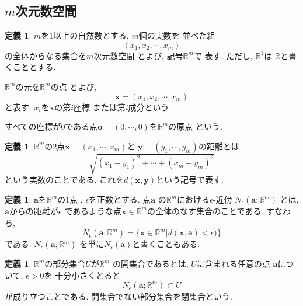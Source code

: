 \documentclass[a4j,12pt]{jarticle}
\theoremstyle{definition}
\newtheorem{definition}[theorem]{定義}
\newtheorem{proposition}[theorem]{命題}
\begin{document}
\subsection{$m$次元数空間}
\begin{definition}
    $m$を$1$以上の自然数とする. $m$個の実数を
    並べた組
    $$(x_1,x_2, \cdots ,x_m)$$
    の全体からなる集合を$m$次元数空間
    とよび, 記号$\mathbb{R}^m$で
    表す. ただし, $\mathbb{R}^1$は
    $\mathbb{R}$と書くこととする. 

    $\mathbb{R}^m$の元を$\mathbb{R}^m$の点
    とよび, 
    $$\boldsymbol{x}=(x_1,x_2, \cdots ,x_m)$$
    と表す. $x_i$を$\boldsymbol{x}$の第$i$座標
    または第$i$成分という. 

    すべての座標が$0$である点$\boldsymbol{o}
    =(0,\cdots ,0)$を$\mathbb{R}^m$の原点
    という. 
\end{definition}
\begin{definition}
    $\mathbb{R}^m$の$2$点$\boldsymbol{x}
    =(x_1,\cdots ,x_m)$と
    $\boldsymbol{y}
    =(y_1,\cdots ,y_m)$の距離とは
    $$\sqrt{(x_1-y_1)^2+\cdots +(x_m-y_m)^2}$$
    という実数のことである. これを$d(\boldsymbol{x},
    \boldsymbol{y})$という記号で表す. 
\end{definition}
\begin{definition}
    $\boldsymbol{a}$を$\mathbb{R}^m$の$1$点
    , $\epsilon$を正数とする. 点$\boldsymbol{a}$
    の$\mathbb{R}^m$における$\epsilon$-近傍
    $N_\epsilon(\boldsymbol{a};\mathbb{R}^m)$
    とは, $\boldsymbol{a}$からの距離が$\epsilon$
    であるような点$\boldsymbol{x}\in 
    \mathbb{R}^m$の全体のなす集合のことである. 
    すなわち, 
    $$N_\epsilon(\boldsymbol{a};\mathbb{R}^m)=
    \{\boldsymbol{x}\in \mathbb{R}^m
    |d(\boldsymbol{x},\boldsymbol{a})<\epsilon)
    \}$$
    である. $N_\epsilon(\boldsymbol{a};\mathbb{R}^m)$
    を単に$N_\epsilon(\boldsymbol{a})$と書くこともある. 
\end{definition}
\begin{definition}
    $\mathbb{R}^m$の部分集合$U$が$\mathbb{R}^m$
    の開集合であるとは, $U$に含まれる任意の点
    $\boldsymbol{a}$について, $\epsilon>0$を
    十分小さくとると
    $$N_\epsilon(\boldsymbol{a};\mathbb{R}^m)
    \subset U$$
    が成り立つことである. 
    開集合でない部分集合を閉集合という. 
\end{definition}

\end{document}
